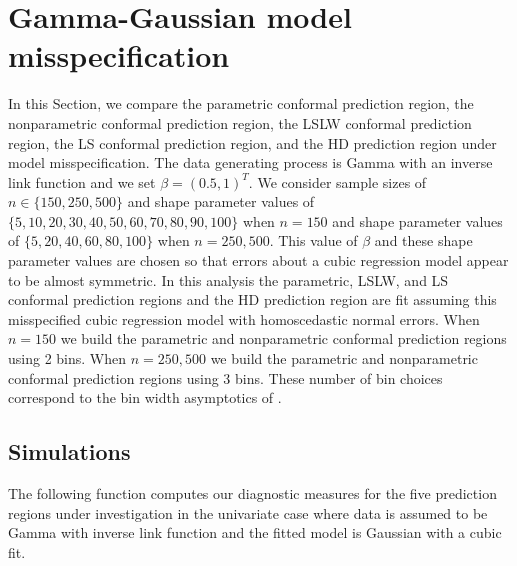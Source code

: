 \documentclass[11pt]{article}\usepackage[]{graphicx}\usepackage[]{color}
\begin{document}
\newpage
\section{Gamma-Gaussian model misspecification}
\label{sec:misspec}

In this Section, we compare the parametric conformal prediction 
region, the nonparametric conformal prediction region, the LSLW conformal 
prediction region, the LS conformal prediction region, and the HD prediction 
region under model misspecification.  The data generating process is Gamma 
with an inverse link function and we set $\beta = (0.5, 1)^T$.
We consider sample sizes of $n \in \{150, 250, 500\}$ and shape parameter 
values of $\{5, 10, 20, 30, 40, 50, 60, 70, 80, 90, 100\}$ when $n = 150$ and 
shape parameter values of $\{5, 20, 40, 60, 80, 100\}$ when $n = 250, 500$.  
This value of $\beta$ and these shape parameter values are chosen so that 
errors about a cubic regression model appear to be almost symmetric.  In this 
analysis the parametric, LSLW, and LS conformal prediction regions and the HD 
prediction region are fit assuming this misspecified cubic regression model 
with homoscedastic normal errors.  When $n = 150$ we build the parametric and 
nonparametric conformal prediction regions using 2 bins.  When $n = 250, 500$ 
we build the parametric and nonparametric conformal prediction regions using 
3 bins.  These number of bin choices correspond to the bin width asymptotics 
of \citet{lei2014distribution}. 



\subsection{Simulations}

The following function computes our diagnostic measures for the five 
prediction regions under investigation in the univariate case where data 
is assumed to be Gamma with inverse link function and the fitted model is 
Gaussian with a cubic fit.  
\end{document}
